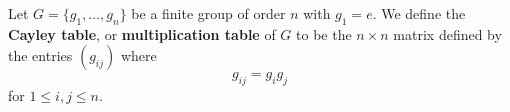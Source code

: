 \begin{definition}
    Let $G=\{g_1, \dots, g_n\}$ be a finite group of order $n$ with $g_1=e$. We
    define the \textbf{Cayley table}, or \textbf{multiplication table} of $G$ to
    be the  $n \times n$ matrix defined by the entries $(g_{ij})$ where
    \begin{equation*}
        g_{ij}=g_ig_j
    \end{equation*}
    for $1 \leq i,j \leq n$.
\end{definition}
